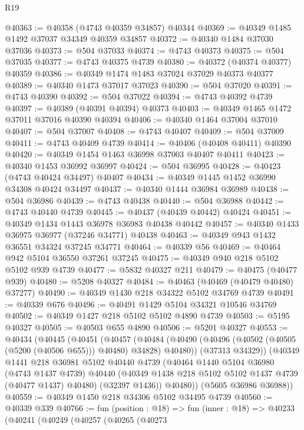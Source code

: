 \begin{lexlean}{R19}
\begin{coremodule}
{{{{{{{{{{{@40363 := @40358 (@4743 @40359 @34857) @40344
@40369 := @40349 @1485 @1492 @37037 @34349 @40359 @34857
@40372 := @40340 @1484 @37030 @37036
@40373 := @504 @37033
@40374 := @4743 @40373
@40375 := @504 @37035
@40377 := @4743 @40375 @4739
@40380 := @40372 (@40374 @40377) @40359
@40386 := @40349 @1474 @1483 @37024 @37029 @40373 @40377
@40389 := @40340 @1473 @37017 @37023
@40390 := @504 @37020
@40391 := @4743 @40390
@40392 := @504 @37022
@40394 := @4743 @40392 @4739
@40397 := @40389 (@40391 @40394) @40373
@40403 := @40349 @1465 @1472 @37011 @37016 @40390 @40394
@40406 := @40340 @1464 @37004 @37010
@40407 := @504 @37007
@40408 := @4743 @40407
@40409 := @504 @37009
@40411 := @4743 @40409 @4739
@40414 := @40406 (@40408 @40411) @40390
@40420 := @40349 @1454 @1463 @36998 @37003 @40407 @40411
@40423 := @40340 @1453 @36992 @36997
@40424 := @504 @36995
@40428 := @40423 (@4743 @40424 @34497) @40407
@40434 := @40349 @1445 @1452 @36990 @34308 @40424 @34497
@40437 := @40340 @1444 @36984 @36989
@40438 := @504 @36986
@40439 := @4743 @40438
@40440 := @504 @36988
@40442 := @4743 @40440 @4739
@40445 := @40437 (@40439 @40442) @40424
@40451 := @40349 @1434 @1443 @36978 @36983 @40438 @40442
@40457 := @40340 @1433 @36975 @36977 (@37246 @34771) @40438
@40463 := @40349 @943 @1432 @36551 @34324 @37245 @34771
@40464 := @40339 @56
@40469 := @40464 @942 @5104 @36550 @37261 @37245
@40475 := @40349 @940 @218 @5102 @5102 @939 @4739
@40477 := @5832 @40327 @211
@40479 := @40475 (@40477 @939)
@40480 := @5208 @40327
@40484 := @40463 (@40469 (@40479 @40480) @37277)
@40490 := @40349 @1430 @218 @34322 @5102 @34769 @4739
@40491 := @40339 @676
@40496 := @40491 @1429 @5104 @34321 @10546 @34769
@40502 := @40349 @1427 @218 @5102 @5102 @4890 @4739
@40503 := @5195 @40327
@40505 := @40503 @655 @4890
@40506 := @5201 @40327
@40553 := @40434
    (@40445
      (@40451
        (@40457
          (@40484 (@40490 (@40496 (@40502 (@40505 (@5200 (@40506 @655))) @40480) @34828) @40480))
          (@37313 @34329))
        (@40349
          @1441
          @218
          @36981
          @5102
          @40440
          @4739
          (@40464
            @1440
            @5104
            @36980
            (@4743 @1437 @4739)
            @40440
            (@40349 @1438 @218 @5102 @5102 @1437 @4739 (@40477 @1437) @40480)
            (@32397 @1436))
          @40480))
      (@5605 @36986 @36988))
@40559 := @40349 @1450 @218 @34306 @5102 @34495 @4739
@40560 := @40339 @339
@40766 := fun (position : @18) =>
  fun (inner : @18) =>
  @40233
    (@40241
      (@40249
        (@40257
          (@40265
            (@40273
}}}}}}}}}}}
\end{coremodule}
\end{lexlean}
